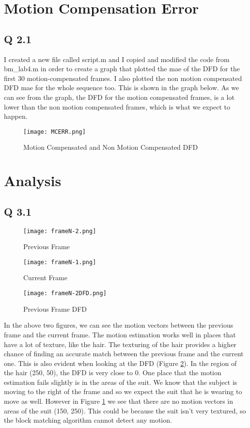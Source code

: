 \section{Motion Compensation Error}
\subsection{Q 2.1}
I created a new file called script.m and I copied and modified the code from bm\_lab4.m in order to create a graph that
plotted the mae of the DFD for the first 30 motion-compensated frames. I also plotted the non motion compensated DFD mae for the whole
sequence too. This is shown in the graph below. As we can see from the graph, the DFD for the motion compensated frames,
is a lot lower than the non motion compensated frames, which is what we expect to happen.

\begin{figure}[!h]
    \texttt{[image: MCERR.png]}
    \centering
    \caption{Motion Compensated and Non Motion Compensated DFD}
\end{figure}

\section{Analysis}
\subsection{Q 3.1}

\begin{figure}[!h]
    \texttt{[image: frameN-2.png]}
    \centering
    \label{fig:prevframe}
    \caption{Previous Frame}
\end{figure}

\begin{figure}[!h]
    \texttt{[image: frameN-1.png]}
    \centering
    \caption{Current Frame}
\end{figure}

\begin{figure}[!h]
    \texttt{[image: frameN-2DFD.png]}
    \centering
    \label{fig:prevframedfd}
    \caption{Previous Frame DFD}
\end{figure}


In the above two figures, we can see the motion vectors between the previous frame and the current frame. The motion
estimation works well in places that have a lot of texture, like the hair. The texturing of the hair provides a higher
chance of finding an accurate match between the previous frame and the current one. This is also evident when looking at
the DFD (Figure \ref{fig:prevframedfd}). In the region of the hair (250, 50), the DFD is very close to 0. One place that
the motion estimation fails slightly is in the areas of the suit. We know that the subject is moving to the right of the
frame and so we expect the suit that he is wearing to move as well. However in Figure \ref{fig:prevframe} we see that
there are no motion vectors in areas of the suit (150, 250). This could be because the suit isn't very textured, so the
block matching algorithm cannot detect any motion.

